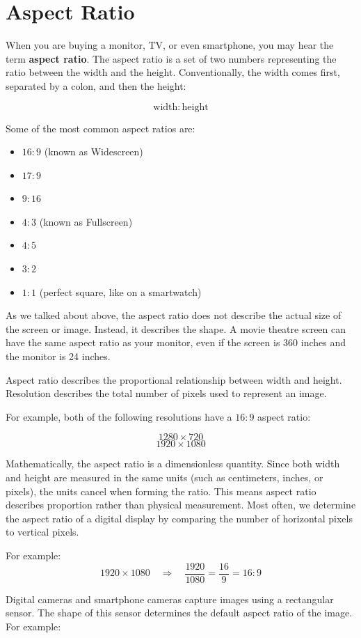 \section{Aspect Ratio}
When you are buying a monitor, TV, or even smartphone, you may hear the term \textbf{aspect ratio}. The aspect ratio is a set of two numbers representing the ratio between the width and the height. Conventionally, the width comes first, separated by a colon, and then the height:

$$\mathrm{width} : \mathrm{height}$$

Some of the most common aspect ratios are:
\begin{itemize}
    \item $16:9$ (known as Widescreen)
    \item $17:9$
    \item $9:16$
    \item $4:3$ (known as Fullscreen)
    \item $4:5$
    \item $3:2$
    \item $1:1$ (perfect square, like on a smartwatch)
\end{itemize}

As we talked about above, the aspect ratio does not describe the actual size of the screen or image. Instead, it describes the shape. A movie theatre screen can have the same aspect ratio as your monitor, even if the screen is 360 inches and the monitor is 24 inches.

Aspect ratio describes the proportional relationship between width and height.
Resolution describes the total number of pixels used to represent an image.

For example, both of the following resolutions have a $16:9$ aspect ratio:

\[
    1280 \times 720
\]
\[
    1920 \times 1080
\]


Mathematically, the aspect ratio is a dimensionless quantity. Since both width and height are measured in the same units (such as centimeters, inches, or pixels), the units cancel when forming the ratio. This means aspect ratio describes proportion rather than physical measurement. Most often, we determine the aspect ratio of a digital display by comparing the number of horizontal pixels to vertical pixels.

For example:
\[
    1920 \times 1080 \quad \Rightarrow \quad \frac{1920}{1080} = \frac{16}{9} = 16:9
\]

Digital cameras and smartphone cameras capture images using a rectangular sensor. The shape of this sensor determines the default aspect ratio of the image. For example:

